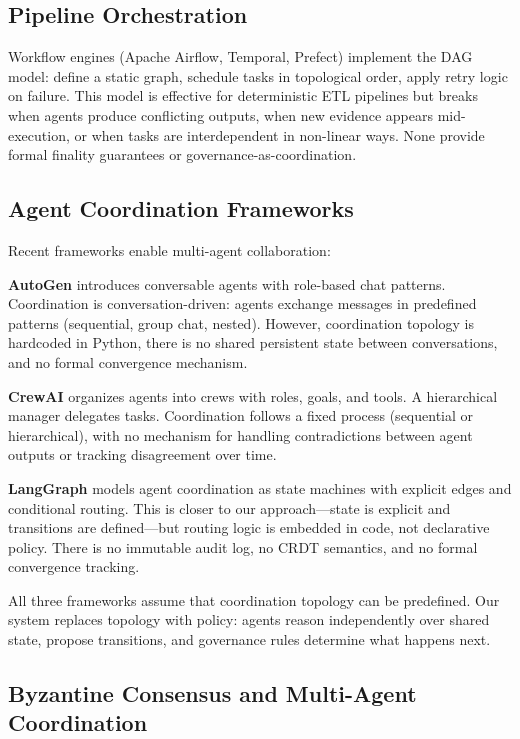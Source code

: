 \documentclass[11pt]{article}
\begin{document}
\subsection{Pipeline Orchestration}

Workflow engines (Apache Airflow, Temporal, Prefect) implement the DAG model: define a static graph, schedule tasks in topological order, apply retry logic on failure. This model is effective for deterministic ETL pipelines but breaks when agents produce conflicting outputs, when new evidence appears mid-execution, or when tasks are interdependent in non-linear ways. None provide formal finality guarantees or governance-as-coordination.

\subsection{Agent Coordination Frameworks}

Recent frameworks enable multi-agent collaboration:

\textbf{AutoGen} \cite{wu2023autogen} introduces conversable agents with role-based chat patterns. Coordination is conversation-driven: agents exchange messages in predefined patterns (sequential, group chat, nested). However, coordination topology is hardcoded in Python, there is no shared persistent state between conversations, and no formal convergence mechanism.

\textbf{CrewAI} \cite{crewai2024} organizes agents into crews with roles, goals, and tools. A hierarchical manager delegates tasks. Coordination follows a fixed process (sequential or hierarchical), with no mechanism for handling contradictions between agent outputs or tracking disagreement over time.

\textbf{LangGraph} \cite{langgraph2024} models agent coordination as state machines with explicit edges and conditional routing. This is closer to our approach---state is explicit and transitions are defined---but routing logic is embedded in code, not declarative policy. There is no immutable audit log, no CRDT semantics, and no formal convergence tracking.

All three frameworks assume that coordination topology can be predefined. Our system replaces topology with policy: agents reason independently over shared state, propose transitions, and governance rules determine what happens next.

\subsection{Byzantine Consensus and Multi-Agent Coordination}
\end{document}
